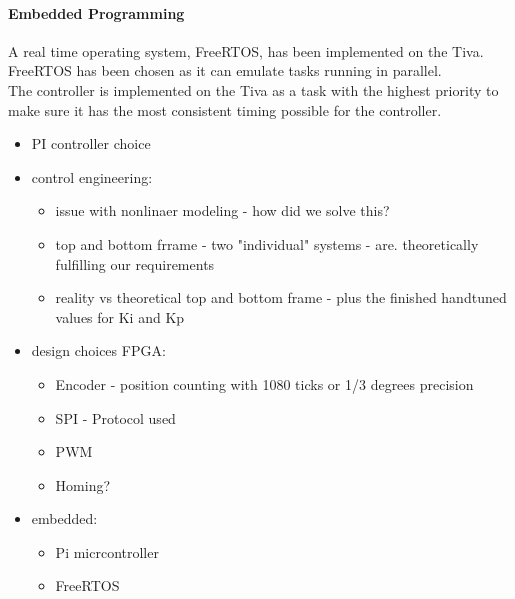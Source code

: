 \documentclass[../../main]{subfiles}
\begin{document}
\paragraph{Embedded Programming}
A real time operating system, FreeRTOS, has been implemented on the Tiva. FreeRTOS has been chosen as it can emulate tasks running in parallel. \\
The controller is implemented on the Tiva as a task with the highest priority to make sure it has the most consistent timing possible for the controller.

\begin{itemize}
  \item PI controller choice
  \item control engineering:
  \begin{itemize}
    \item issue with nonlinaer modeling - how did we solve this?
    \item top and bottom frrame - two "individual" systems - are. theoretically fulfilling our requirements
    \item reality vs theoretical top and bottom frame - plus the finished handtuned values for Ki and Kp
  \end{itemize}
  \item design choices FPGA:
    \begin{itemize}
      \item Encoder - position counting with 1080 ticks or 1/3 degrees precision
      \item SPI - Protocol used
      \item PWM
      \item Homing?
    \end{itemize}
  \item embedded:
  \begin{itemize}
    \item Pi micrcontroller
    \item FreeRTOS
  \end{itemize}


\end{itemize}
\end{document}
